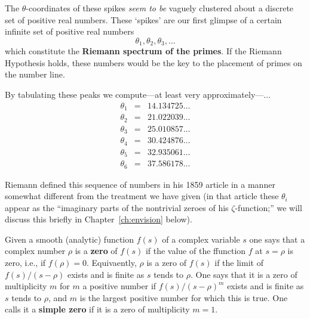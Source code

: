 \documentclass[openany]{book}
\newcommand{\ill}[3]{%
   \begin{figure}[H]%
   \vspace{-2ex}
   \centering%
   \texttt{[image: illustrations/\#1]}%
   \caption{#3}%
   \vspace{-2ex}
    \end{figure}}
\theoremstyle{plain}
\theoremstyle{definition}
\begin{document}





The $\theta$-coordinates of these spikes  {\it seem to be}
vaguely clustered about a discrete set of positive real numbers.
These `spikes' are our first glimpse of a
certain infinite set of positive real numbers
 $$\theta_1,\theta_2,\theta_3,\dots$$ which constitute the {\bf Riemann spectrum of
  the primes}. If the Riemann Hypothesis holds, these numbers would
be the key to the placement of primes on the number line.








By tabulating these peaks we compute---at least very approximately---$\dots$
\begin{eqnarray*}
\theta_1 &=& 14.134725 \dots\\
\theta_2 &=& 21.022039 \dots\\
\theta_3 &=& 25.010857 \dots\\
\theta_4 &=& 30.424876 \dots\\
\theta_5 &=& 32.935061 \dots\\
\theta_6 &=& 37.586178 \dots
\end{eqnarray*}

Riemann defined this sequence of numbers in his 1859 article in a
manner somewhat different from the treatment we have given (in that
article these $\theta_i$ appear as the ``imaginary parts of the
nontrivial zeroes of his $\zeta$-function;'' we will discuss this
briefly in Chapter~\ref{ch:envision} below).

Given a smooth (analytic) function $f(s)$  of a complex variable $s$ one says that a complex number $\rho$ is a {\bf zero} of $f(s)$  if the value of the ffunction $f$ at $s=\rho$ is zero, i.e., if $f(\rho)=0$. Equivaently, $\rho$ is a zero of $f(s)$ if the limit of $f(s)/(s-\rho)$ exists and is finite as $s$ tends to $\rho$.  One says that it is a zero of multiplicity $m$ for $m$ a positive number if $f(s)/(s-\rho)^m$ exists and is finite as $s$ tends to $\rho$, and $m$ is the largest positive number for which this is true. One calls it a {\bf simple zero} if it is a zero of multiplicity $m=1$.
\end{document}
